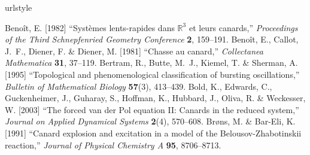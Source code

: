 \documentclass{ws-ijbc}
\begin{document}

%
\begin{thebibliography}{46}
\newcommand{\enquote}[1]{``#1''}
\providecommand{\natexlab}[1]{#1}
\providecommand{\url}[1]{\texttt{#1}}
\providecommand{\urlprefix}{URL }
\expandafter\ifx\csname urlstyle\endcsname\relax
  \providecommand{\doi}[1]{doi:\discretionary{}{}{}#1}\else
  \providecommand{\doi}{doi:\discretionary{}{}{}\begingroup
  \urlstyle{rm}\Url}\fi

Beno{\^i}t, E. [1982] \enquote{Syst{\`e}mes lents-rapides dans $\mathbb{R}^3$
et leurs canards,} \emph{Proceedings of the Third Schnepfenried Geometry
Conference} \textbf{2},  159--191.
%
%
Beno{\^i}t, E., Callot, J.~F., Diener, F. \& Diener, M. [1981] \enquote{Chasse
au canard,} \emph{Collectanea Mathematica} \textbf{31},  37--119.
% 
Bertram, R., Butte, M.~J., Kiemel, T. \& Sherman, A. [1995]
\newblock \enquote{Topological and phenomenological classification of bursting oscillations,}
\newblock \emph{Bulletin of Mathematical Biology} \textbf{57}(3), 413--439.
%
Bold, K., Edwards, C., Guckenheimer, J., Guharay, S., Hoffman, K., Hubbard, J., Oliva, R. \& Weckesser, W. [2003]
\newblock \enquote{The forced van der Pol equation II: Canards in the reduced system,}
\newblock \emph{Journal on Applied Dynamical Systems} \textbf{2}(4), 570--608.
% 
Br{\o}ns, M. \& Bar-Eli, K. [1991] \enquote{Canard explosion and excitation in
a model of the {B}elousov-{Z}habotinskii reaction,} 
\emph{Journal of Physical Chemistry A} \textbf{95},  8706--8713.
% 
% 

\end{thebibliography}
\end{document}
